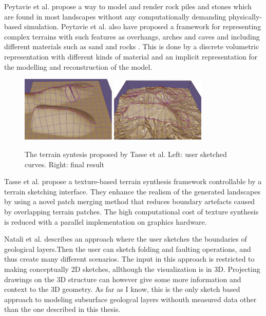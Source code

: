 \documentclass[a4paper,12pt]{report}
\begin{document}
 Peytavie et al. \cite{peytavie2009procedural} propose a way to model and render rock piles and stones which are found in most landscapes without any computationally demanding physically-based simulation. Peytavie et al. also have proposed a framework for representing complex terrains with such features as overhangs, arches and caves and including different materials such as sand and rocks \cite{peytavie2009arches}. This is done by a discrete volumetric representation with different kinds of material and an implicit representation for the modelling and reconstruction of the model.

\begin{figure}
 \centering
 \includegraphics[width=0.4\textwidth]{thesis/related/tasse1.png}
 \includegraphics[width=0.4\textwidth]{thesis/related/tasse2.png}
 \caption{The terrain syntesis proposed by Tasse et al. Left: user sketched curves. Right: final result }
 \label{fig:tasse}
\end{figure}

 
 
Tasse et al. \cite{tasse2012enhanced} propose a texture-based terrain synthesis framework controllable by
a terrain sketching interface. They enhance the realism of the generated landscapes by using a novel patch merging
method that reduces boundary artefacts caused by overlapping terrain patches. The high computational cost of texture
synthesis is reduced with a parallel implementation on graphics hardware.


 







Natali et al. \cite{natalirapid} describes an approach where the user sketches the boundaries of geological layers.Then the user can sketch folding and faulting operations, and thus create many different scenarios. The input in this approach is restricted to making conceptually 2D sketches, allthough the visualization is in 3D. Projecting drawings on the 3D structure can however give some more information and context to the 3D geometry.  As far as I know, this is the only sketch based approach to modeling subsurface geologcal layers withouth measured data other than the one described in this thesis.
\end{document}
